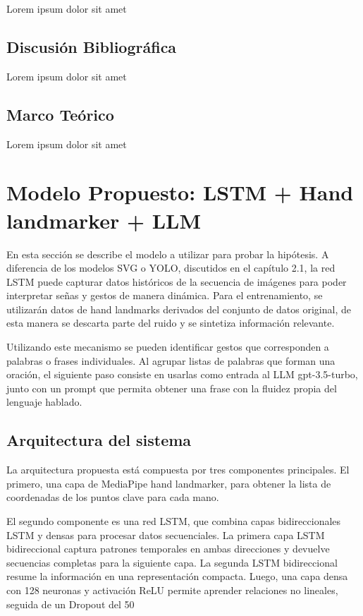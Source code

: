 \documentclass{article}
\begin{document}
Lorem ipsum dolor sit amet

\subsection{Discusión Bibliográfica}

Lorem ipsum dolor sit amet

\subsection{Marco Teórico}

Lorem ipsum dolor sit amet

\section{Modelo Propuesto: LSTM + Hand landmarker + LLM}

En esta sección se describe el modelo a utilizar para probar la hipótesis. A diferencia de los modelos SVG o YOLO, discutidos en el capítulo 2.1, la red LSTM puede capturar datos históricos de la secuencia de imágenes para poder interpretar señas y gestos de manera dinámica. Para el entrenamiento, se utilizarán datos de hand landmarks derivados del conjunto de datos original, de esta manera se descarta parte del ruido y se sintetiza información relevante.

Utilizando este mecanismo se pueden identificar gestos que corresponden a palabras o frases individuales. Al agrupar listas de palabras que forman una oración, el siguiente paso consiste en usarlas como entrada al LLM gpt-3.5-turbo, junto con un prompt que permita obtener una frase con la fluidez propia del lenguaje hablado.

\subsection{Arquitectura del sistema}

La arquitectura propuesta está compuesta por tres componentes principales. El primero, una capa de MediaPipe hand landmarker, para obtener la lista de coordenadas de los puntos clave para cada mano.

El segundo componente es una red LSTM, que combina capas bidireccionales LSTM y densas para procesar datos secuenciales. La primera capa LSTM bidireccional captura patrones temporales en ambas direcciones y devuelve secuencias completas para la siguiente capa. La segunda LSTM bidireccional resume la información en una representación compacta. Luego, una capa densa con 128 neuronas y activación ReLU permite aprender relaciones no lineales, seguida de un Dropout del 50%
\end{document}
